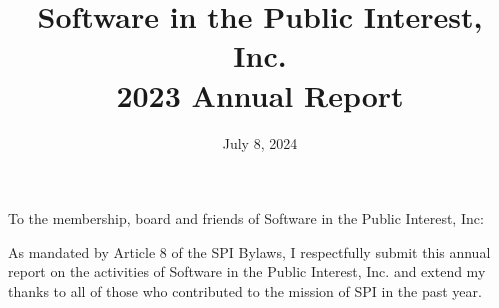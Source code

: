 \documentclass[a4paper]{report}
\begin{document}
\title{Software in the Public Interest, Inc.\\
2023 Annual Report}
\date{July 8, 2024}

\maketitle

\newpage


\hspace{1em}

To the membership, board and friends of Software in the Public Interest, Inc:

As mandated by Article 8 of the SPI Bylaws, I respectfully submit this annual report on the activities of Software in the Public Interest, Inc. and extend my thanks to all of those who contributed to the mission of SPI in the past year.
\end{document}
